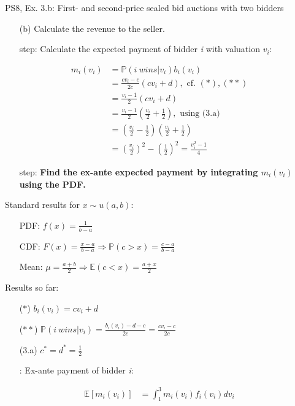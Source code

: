 \begin{frame}{PS8, Ex. 3.b: First- and second-price sealed bid auctions with two bidders}
    \begin{multicols}{2}
      \begin{itemize}
        \item[(b)] Calculate the revenue to the seller.
        \item[\nth{1} step:] Calculate the expected payment of bidder \textit{i} with valuation $v_i$:
      \end{itemize}
      \vspace{-6pt}
      \begin{align*}
        m_i(v_i)&=\mathbb{P}(i\ wins|v_i)b_i(v_i)\\
                &=\frac{cv_i-c}{2c}(cv_i+d),\text{ cf. }(*),(**)\\
                &=\frac{v_i-1}{2}(cv_i+d)\\
                &=\frac{v_i-1}{2}\left(\frac{v_i}{2}+\frac{1}{2}\right),\text{ using (3.a)}\\
                &=\left(\frac{v_i}{2}-\frac{1}{2}\right)\left(\frac{v_i}{2}+\frac{1}{2}\right)\\
                &=\left(\frac{v_i}{2}\right)^2-\left(\frac{1}{2}\right)^2
                 =\frac{v_i^2-1}{4}
      \end{align*}
      \vspace{-12pt}
      \begin{itemize}
        \item[\nth{2} step:] \textbf{Find the ex-ante expected payment by integrating $m_i(v_i)$ using the PDF.}
      \end{itemize}
      \vfill\null\columnbreak
      Standard results for $x\sim u(a, b):$
      \vspace{-6pt}
      \begin{enumerate}
        \item[PDF:] $f(x)=\frac{1}{b-a}$
        \item[CDF:] $F(x)=\frac{x-a}{b-a}\Rightarrow\mathbb{P}(c>x)=\frac{c-a}{b-a}$
        \item[Mean:] $\mu=\frac{a+b}{2}\Rightarrow\mathbb{E}(c<x)=\frac{a+x}{2}$
      \end{enumerate}
      \vspace{-6pt}
      Results so far:
      \vspace{-6pt}
      \begin{itemize}
        \item[($*$)]  $b_i(v_i) = cv_i+d$
        \item[($**$)] $\mathbb{P}(i\ wins|v_i)=\frac{b_i(v_i)-d-c}{2c}=\frac{cv_i-c}{2c}$
        \item[(3.a)]    $c^*=d^*=\frac{1}{2}$
        \item[\nth{2}:] Ex-ante payment of bidder \textit{i}:
      \end{itemize}
      \vspace{-12pt}
      \begin{align*}
        \mathbb{E}[m_i(v_i)]&=\textstyle\int_1^3m_i(v_i)f_i(v_i)dv_i
      \end{align*}
      \vfill\null
    \end{multicols}
\end{frame}
